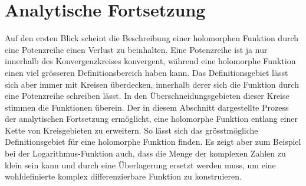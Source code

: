 %
%
%
\section{Analytische Fortsetzung
\label{buch:analytisch:section:fortsetzung}}
Auf den ersten Blick scheint die Beschreibung einer holomorphen
Funktion durch eine Potenzreihe einen Verlust zu beinhalten.
Eine Potenzreihe ist ja nur innerhalb des Konvergenzkreises
konvergent, während eine holomorphe Funktion einen viel grösseren
Definitionsbereich haben kann.
Das Definitionsgebiet lässt sich aber immer mit Kreisen überdecken,
innerhalb derer sich die Funktion durch eine Potenzreihe schreiben
lässt.
In den Überschneidungsgebieten dieser Kreise stimmen die Funktionen
überein.
Der in diesem Abschnitt dargestellte Prozess der analytischen
Fortsetzung ermöglicht, eine holomorphe Funktion entlang einer
Kette von Kreisgebieten zu erweitern.
So lässt sich das grösstmögliche Definitionsgebiet
für eine holomorphe Funktion finden.
Es zeigt aber zum Beispiel bei der Logarithmus-Funktion auch, dass
die Menge der komplexen Zahlen zu klein sein kann und durch eine
Überlagerung ersetzt werden muss, um eine wohldefinierte komplex
differenzierbare Funktion zu konstruieren.




